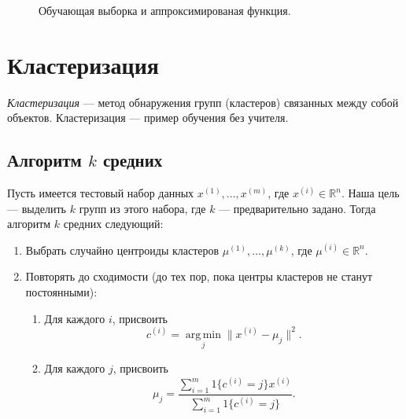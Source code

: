\begin{figure}[htb]
  \centering
  \caption{Обучающая выборка и аппроксимированая функция.}
  \label{ml:descent:lms}
\end{figure}

\section{Кластеризация}
\emph{Кластеризация} — метод обнаружения групп (кластеров) связанных между собой объектов. Кластеризация — пример обучения без учителя.

\subsection{Алгоритм $k$ средних}
Пусть имеется тестовый набор данных $x^{(1)}, \dots, x^{(m)}$, где $x^{(i)} \in \mathbb{R}^n$. Наша цель — выделить $k$ групп из этого набора, где $k$ — предварительно задано. Тогда алгоритм $k$ средних следующий:
\begin{enumerate}
  \item Выбрать случайно центроиды кластеров $\mu^{(1)}, \dots, \mu^{(k)}$, где $\mu^{(i)} \in \mathbb{R}^n$.
  \item Повторять до сходимости (до тех пор, пока центры кластеров не станут постоянными):
    \begin{enumerate}
      \item Для каждого $i$, присвоить \[ c^{(i)} = \operatorname*{arg\,min}_j \| x^{(i)} - \mu_j \|^2. \]
      \item Для каждого $j$, присвоить \[ \mu_j = \frac{\sum_{i = 1}^{m}{1\{ c^{(i)} = j \} x^{(i)}}}{\sum_{i = 1}^{m}{1\{ c^{(i)} = j \}}}. \]
    \end{enumerate}
\end{enumerate}

